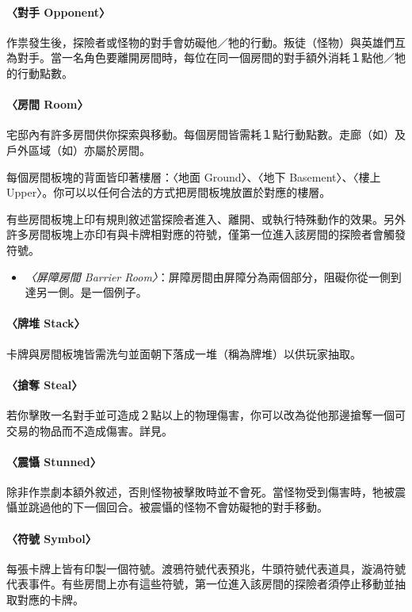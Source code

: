 \paragraph{〈對手 Opponent〉}
作祟發生後，探險者或怪物的對手會妨礙他／牠的行動。叛徒（怪物）與英雄們互為對手。當一名角色要離開房間時，每位在同一個房間的對手額外消耗１點他／牠的行動點數。

\paragraph{〈房間 Room〉}
宅邸內有許多房間供你探索與移動。每個房間皆需耗１點行動點數。走廊（如）及戶外區域（如）亦屬於房間。

每個房間板塊的背面皆印著樓層：〈地面 Ground〉、〈地下 Basement〉、〈樓上 Upper〉。你可以以任何合法的方式把房間板塊放置於對應的樓層。

有些房間板塊上印有規則敘述當探險者進入、離開、或執行特殊動作的效果。另外許多房間板塊上亦印有與卡牌相對應的符號，僅第一位進入該房間的探險者會觸發符號。

\begin{itemize}
  \item \textit{〈屏障房間 Barrier Room〉}：屏障房間由屏障分為兩個部分，阻礙你從一側到達另一側。是一個例子。
\end{itemize}

\paragraph{〈牌堆 Stack〉}
卡牌與房間板塊皆需洗勻並面朝下落成一堆（稱為牌堆）以供玩家抽取。

\paragraph{〈搶奪 Steal〉}
若你擊敗一名對手並可造成２點以上的物理傷害，你可以改為從他那邊搶奪一個可交易的物品而不造成傷害。詳見。

\paragraph{〈震懾 Stunned〉}
除非作祟劇本額外敘述，否則怪物被擊敗時並不會死。當怪物受到傷害時，牠被震懾並跳過他的下一個回合。被震懾的怪物不會妨礙牠的對手移動。

\paragraph{〈符號 Symbol〉}
每張卡牌上皆有印製一個符號。渡鴉符號\OmenSymbol{}代表預兆，牛頭符號\ItemSymbol{}代表道具，漩渦符號\EventSymbol{}代表事件。有些房間上亦有這些符號，第一位進入該房間的探險者須停止移動並抽取對應的卡牌。


